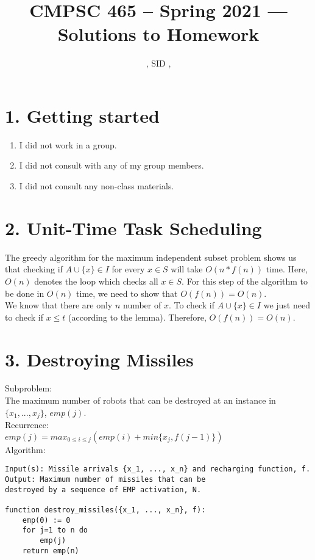 \documentclass[11pt]{article}
\title{CMPSC 465 -- Spring 2021 --- Solutions to Homework \Homework}
\author{\Name, SID \SID, \texttt{\Login}}
\newenvironment{qparts}{\begin{enumerate}[{(}a{)}]}{\end{enumerate}}
\begin{document}
\maketitle


\section*{1. Getting started}
\begin{qparts}
\item
I did not work in a group.
\item
I did not consult with any of my group members.
\item
I did not consult any non-class materials.
\end{qparts}



\newpage
\section*{2. Unit-Time Task Scheduling}

The greedy algorithm for the maximum independent subset problem shows us that checking if $A \cup \{x\} \in I$ for every $x \in S$ will take $O(n * f(n))$ time. Here, $O(n)$ denotes the loop which checks all $x \in S$. For this step of the algorithm to be done in $O(n)$ time, we need to show that $O(f(n)) = O(n)$.\\

We know that there are only $n$ number of $x$. To check if $A \cup \{x\} \in I$ we just need to check if $x \leq t$ (according to the lemma). Therefore, $O(f(n)) = O(n)$.




\newpage
\section*{3. Destroying Missiles}


Subproblem:\\
The maximum number of robots that can be destroyed at an instance in $\{x_1, ..., x_j\}$, $emp(j)$.\\

Recurrence:\\
$emp(j) = max_{0 \leq i \leq j}(emp(i) + min\{x_j, f(j-1)\})$ \\

Algorithm:\\
\begin{lstlisting}
Input(s): Missile arrivals {x_1, ..., x_n} and recharging function, f.
Output: Maximum number of missiles that can be 
destroyed by a sequence of EMP activation, N.

function destroy_missiles({x_1, ..., x_n}, f):
	emp(0) := 0
	for j=1 to n do
		emp(j)
	return emp(n)


\end{lstlisting}
\end{document}
